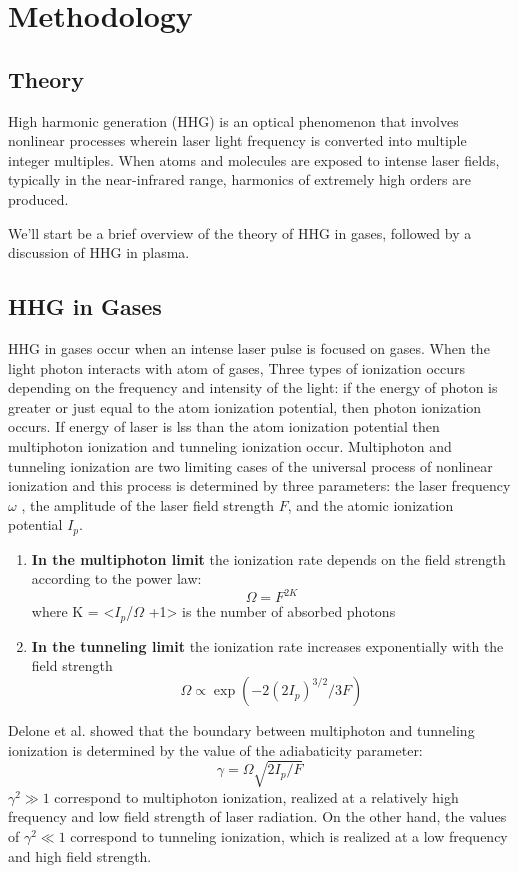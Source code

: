 \documentclass[12pt]{article}
\begin{document}
\section{Methodology}
\subsection{Theory}
High harmonic generation (HHG) is an optical phenomenon that involves nonlinear processes wherein laser light frequency is converted into multiple integer multiples. When atoms and molecules are exposed to intense laser fields, typically in the near-infrared range, harmonics of extremely high orders are produced.\cite{hhg-book}

We'll start be a brief overview of the theory of HHG in gases, followed by a discussion of HHG in plasma.

\subsection{HHG in Gases}
HHG in gases occur when an intense laser pulse is focused on gases. When the light photon interacts with atom of gases, Three types of ionization occurs depending on the frequency and intensity of the light: if the energy of photon is greater or just equal to the atom ionization potential, then photon ionization occurs. If energy of laser is lss than the atom ionization potential then multiphoton ionization and tunneling ionization occur. Multiphoton and tunneling ionization are two limiting cases of the universal process of nonlinear ionization and this process is determined by three parameters: the laser frequency \(\omega\) , the amplitude of the laser field strength $F$, and the atomic ionization potential \(I_p\).

\begin{enumerate}
    \def\labelenumi{\arabic{enumi}.}
    \item \textbf{In the multiphoton limit} the ionization rate depends on the field strength according to the power law: \[\Omega = F^{2K}\] where K = \textless{}\(I_p\)/\(\Omega\) +1\textgreater{} is the number of absorbed photons
    \item \textbf{In the tunneling limit} the ionization rate increases exponentially with the field strength \[\Omega \propto  \exp(-2(2I_p)^{3/2}/3F)\]
\end{enumerate}

Delone et al.\cite{gas-second} showed that the boundary between multiphoton and tunneling ionization is determined by the value of the adiabaticity parameter:
\begin{equation}
    \label{eq:adiabatic}
    \gamma =\Omega \sqrt{2I_p/F}
\end{equation}
\noindent
$\gamma^2 \gg 1$ correspond to multiphoton ionization, realized at a relatively high frequency and low field strength of laser radiation. On the other hand, the values of $\gamma^2 \ll 1$  correspond to tunneling ionization, which is realized at a low frequency and high field strength.
\end{document}
